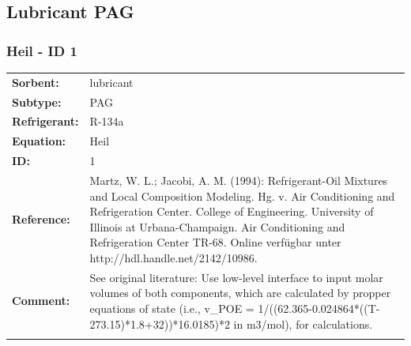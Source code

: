 \subsection{Lubricant PAG}
%
\subsubsection{Heil - ID 1}
%
\begin{tabular}[l]{|lp{11.5cm}|}
\hline
\addlinespace

\textbf{Sorbent:} & lubricant \\
\textbf{Subtype:} & PAG \\
\textbf{Refrigerant:} & R-134a \\
\textbf{Equation:} & Heil \\
\textbf{ID:} & 1 \\
\textbf{Reference:} & Martz, W. L.; Jacobi, A. M. (1994): Refrigerant-Oil Mixtures and Local Composition Modeling. Hg. v. Air Conditioning and Refrigeration Center. College of Engineering. University of Illinois at Urbana-Champaign. Air Conditioning and Refrigeration Center TR-68. Online verfügbar unter http://hdl.handle.net/2142/10986. \\
\textbf{Comment:} & See original literature: Use low-level interface to input molar volumes of both components, which are calculated by propper equations of state (i.e., v\_POE =  1/((62.365-0.024864*((T-273.15)*1.8+32))*16.0185)*2 in m3/mol), for calculations. \\

\addlinespace
\hline
\end{tabular}
\newline

